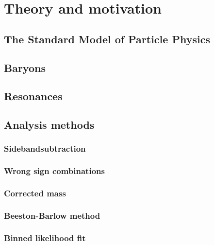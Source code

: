 \chapter{Theory and motivation}
\label{sec:Theory}

\section{The Standard Model of Particle Physics}

\section{Baryons}

\section{Resonances}

\section{Analysis methods}

\subsection{Sidebandsubtraction}
\label{sec:Sidebandsubtraction}

\subsection{Wrong sign combinations}

\subsection{Corrected mass}

\subsection{Beeston-Barlow method}
\label{sec:BeestonBarlow}

\subsection{Binned likelihood fit}
